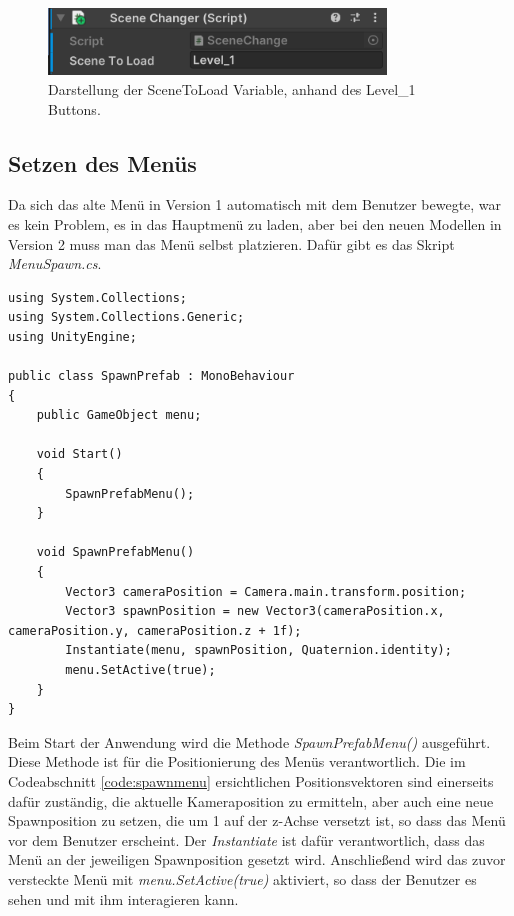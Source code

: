 \begin{figure}[h]
\centering
\includegraphics[width=0.8\textwidth]{images/sceneToLoad.png}
\caption{Darstellung der SceneToLoad Variable, anhand des Level_1 Buttons.}
\label{fig:scenetoload}
\end{figure}

\subsection{Setzen des Menüs}
Da sich das alte Menü in Version 1 automatisch mit dem Benutzer bewegte, war es kein Problem, es in das Hauptmenü zu laden,
aber bei den neuen Modellen in Version 2 muss man das Menü selbst platzieren. Dafür gibt es das Skript \textit{MenuSpawn.cs}.

\begin{lstlisting}[style=csharp, caption=Auf Knopfdruck Szene wechseln. label=code:spawnmenu]
using System.Collections;
using System.Collections.Generic;
using UnityEngine;

public class SpawnPrefab : MonoBehaviour
{
    public GameObject menu;

    void Start()
    {
        SpawnPrefabMenu();
    }

    void SpawnPrefabMenu()
    {
        Vector3 cameraPosition = Camera.main.transform.position;
        Vector3 spawnPosition = new Vector3(cameraPosition.x, cameraPosition.y, cameraPosition.z + 1f);
        Instantiate(menu, spawnPosition, Quaternion.identity);
        menu.SetActive(true);
    }
}
\end{lstlisting}

Beim Start der Anwendung wird die Methode \textit{SpawnPrefabMenu()} ausgeführt. Diese Methode ist für die Positionierung
des Menüs verantwortlich. Die im Codeabschnitt \ref{code:spawnmenu} ersichtlichen Positionsvektoren sind einerseits dafür
zuständig, die aktuelle Kameraposition zu ermitteln, aber auch eine neue Spawnposition zu setzen, die um 1 auf der z-Achse
versetzt ist, so dass das Menü vor dem Benutzer erscheint. Der \textit{Instantiate} ist dafür verantwortlich, dass das Menü
an der jeweiligen Spawnposition gesetzt wird. Anschließend wird das zuvor versteckte Menü mit \textit{menu.SetActive(true)}
aktiviert, so dass der Benutzer es sehen und mit ihm interagieren kann.

